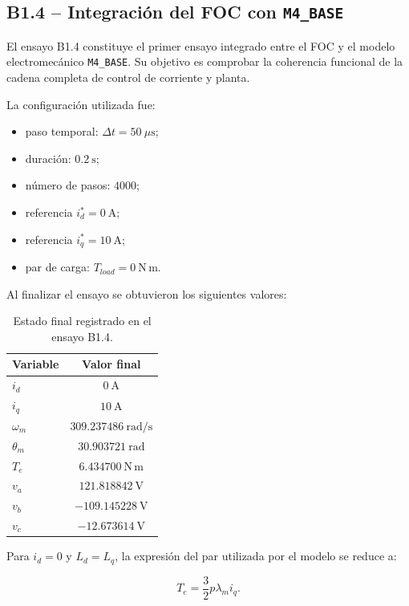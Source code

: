 \subsection{B1.4 -- Integración del FOC con \texttt{M4\_BASE}}

El ensayo B1.4 constituye el primer ensayo integrado entre el FOC y el modelo electromecánico \texttt{M4\_BASE}. Su objetivo es comprobar la coherencia funcional de la cadena completa de control de corriente y planta.

La configuración utilizada fue:

\begin{itemize}
\item paso temporal: \(\Delta t=50~\mu\mathrm{s}\);
\item duración: \(0.2~\mathrm{s}\);
\item número de pasos: \(4000\);
\item referencia \(i_d^*=0~\mathrm{A}\);
\item referencia \(i_q^*=10~\mathrm{A}\);
\item par de carga: \(T_{load}=0~\mathrm{N\,m}\).
\end{itemize}

Al finalizar el ensayo se obtuvieron los siguientes valores:

\begin{table}[H]
\centering
\caption{Estado final registrado en el ensayo B1.4.}
\label{tab:b1_4_resultado}
\begin{tabular}{lc}
\toprule
\textbf{Variable} & \textbf{Valor final} \\
\midrule
\(i_d\) & \(0~\mathrm{A}\) \\
\(i_q\) & \(10~\mathrm{A}\) \\
\(\omega_m\) & \(309.237486~\mathrm{rad/s}\) \\
\(\theta_m\) & \(30.903721~\mathrm{rad}\) \\
\(T_e\) & \(6.434700~\mathrm{N\,m}\) \\
\(v_a\) & \(121.818842~\mathrm{V}\) \\
\(v_b\) & \(-109.145228~\mathrm{V}\) \\
\(v_c\) & \(-12.673614~\mathrm{V}\) \\
\bottomrule
\end{tabular}
\end{table}

Para \(i_d=0\) y \(L_d=L_q\), la expresión del par utilizada por el modelo se reduce a:

\begin{equation}
T_e=
\frac{3}{2}p\lambda_m i_q.
\end{equation}

